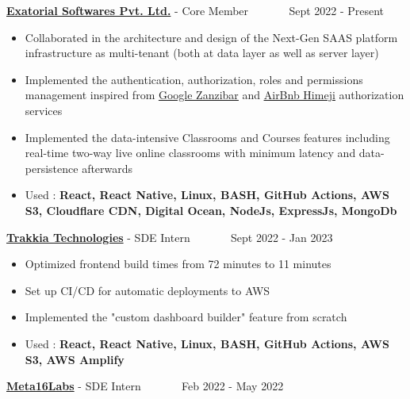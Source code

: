 \documentclass[10pt,a4paper,ragged2e,withhyper]{altacv}
\begin{document}
\begin{paracol}{2}


\large \textcolor{VividPurple}{\href{https://exatorial.com/}{\textbf{Exatorial Softwares Pvt. Ltd.}}} - Core Member ~~~~~~ \normalsize \faCalendar Sept 2022 - Present
\begin{itemize}
  \item Collaborated in the architecture and design of the Next-Gen SAAS platform infrastructure as multi-tenant (both at data layer as well as server layer)
  \item Implemented the authentication, authorization, roles and permissions management inspired from \href{https://research.google/pubs/pub48190/}{\underline{Google Zanzibar}} and \href{https://medium.com/airbnb-engineering/himeji-a-scalable-centralized-system-for-authorization-at-airbnb-341664924574}{\underline{AirBnb Himeji}} authorization services
  \item Implemented the data-intensive Classrooms and Courses features including real-time two-way live online classrooms with minimum latency and data-persistence afterwards
  \item Used : \textcolor{VividPurple}{\textbf{React, React Native, Linux, BASH, GitHub Actions, AWS S3, Cloudflare CDN, Digital Ocean, NodeJs, ExpressJs, MongoDb}}
\end{itemize}

\divider

\large \textcolor{VividPurple}{\href{https://www.trakkia.com}{\textbf{Trakkia Technologies}}} - SDE Intern ~~~~~~ \normalsize \faCalendar Sept 2022 - Jan 2023

\begin{itemize}
  \item Optimized frontend build times from 72 minutes to 11 minutes 
  \item Set up CI/CD for automatic deployments to AWS
  \item Implemented the "custom dashboard builder" feature from scratch
  \item Used : \textcolor{VividPurple}{\textbf{React, React Native, Linux, BASH, GitHub Actions, AWS S3, AWS Amplify}}
\end{itemize}

\divider

\large \textcolor{VividPurple}{\href{https://m16labs.com}{\textbf{Meta16Labs}}} - SDE Intern ~~~~~~ \normalsize \faCalendar Feb 2022 - May 2022


\end{paracol}
\end{document}
